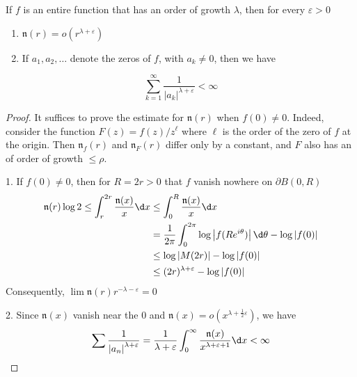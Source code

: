 \documentclass[12pt, oneside]{book}
\begin{document}
\begin{theorem}
    If $f$ is an entire function that has an order of growth $\lambda$, then for every $\varepsilon >0$
    \begin{enumerate}
        \item
              $\mathfrak{n}(r)=o(r^{\lambda+\varepsilon})$
        \item
              If $a_1, a_2,\ldots$ denote the zeros of $f$, with $a_k\neq 0$, then we have
    \end{enumerate}
    $$
        \sum_{k=1}^\infty\frac1{\left|a_k\right|^{\lambda+\varepsilon}}<\infty
    $$
    \begin{proof}
        It suffices to prove the estimate for $\mathfrak{n}(r)$ when $f(0)\neq0$. Indeed, consider the function $F(z)=f(z)/z^\ell$ where $\ell$ is the order of the zero of $f$ at the origin. Then $\mathfrak{n} _f( r)$ and $\mathfrak{n}_F(r)$ differ only by a constant, and $F$ also has an of order of growth $\leq\rho$.

        1. If $f(0)\neq0$, then for $R=2r>0$ that $f$ vanish nowhere on $\partial B(0,R)$
        $$
            \begin{aligned}
                \mathfrak{n}(r)\log2\leq\int_r^{2r}\frac{\mathfrak{n}(x)}{x}\d x & \leq\int_0^R\frac{\mathfrak{n}(x)}{x}\d x                                                 \\
                                                                                 & =\frac1{2\pi}\int_0^{2\pi}\log\left|f(Re^{i\theta})\right|\d \theta-\log\left|f(0)\right| \\
                                                                                 & \leq\log\left|M(2r)\right|-\log\left|f(0)\right|                                          \\
                                                                                 & \leq (2r)^{\lambda+\varepsilon}-\log\left|f(0)\right|
            \end{aligned}$$
        Consequently, $\lim\mathfrak{n}(r)r^{-\lambda-\varepsilon}=0$

        2. Since $\mathfrak{n}(x)$ vanish near the $0$ and $\mathfrak{n}(x)=o(x^{\lambda+\frac{1}{2}\varepsilon})$, we have
        $$
            \sum\frac{1}{\left|a_n\right|^{\lambda+\varepsilon}}
            =
            \frac{1}{\lambda+\varepsilon}
            \int^\infty_0\frac{\mathfrak{n}(x)}{x^{\lambda+\varepsilon + 1}}\d x<\infty$$
    \end{proof}

\end{theorem}
\end{document}
